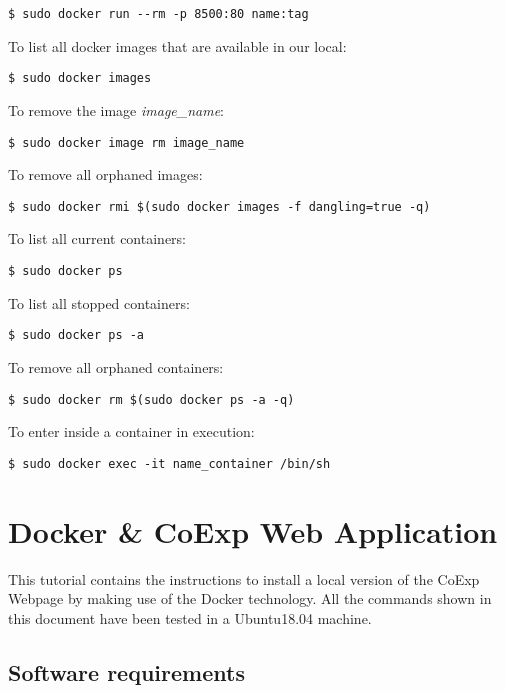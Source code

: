 \documentclass[]{book}
\begin{document}
\begin{verbatim}
$ sudo docker run --rm -p 8500:80 name:tag
\end{verbatim}

To list all docker images that are available in our local:

\begin{verbatim}
$ sudo docker images
\end{verbatim}

To remove the image \emph{image\_name}:

\begin{verbatim}
$ sudo docker image rm image_name
\end{verbatim}

To remove all orphaned images:

\begin{verbatim}
$ sudo docker rmi $(sudo docker images -f dangling=true -q)
\end{verbatim}

To list all current containers:

\begin{verbatim}
$ sudo docker ps
\end{verbatim}

To list all stopped containers:

\begin{verbatim}
$ sudo docker ps -a 
\end{verbatim}

To remove all orphaned containers:

\begin{verbatim}
$ sudo docker rm $(sudo docker ps -a -q)
\end{verbatim}

To enter inside a container in execution:

\begin{verbatim}
$ sudo docker exec -it name_container /bin/sh
\end{verbatim}

\section{Docker \& CoExp Web
Application}\label{docker-coexp-web-application}

This tutorial contains the instructions to install a local version of
the CoExp Webpage by making use of the Docker technology. All the
commands shown in this document have been tested in a Ubuntu18.04
machine.

\subsection{Software requirements}\label{software-requirements}
\end{document}
